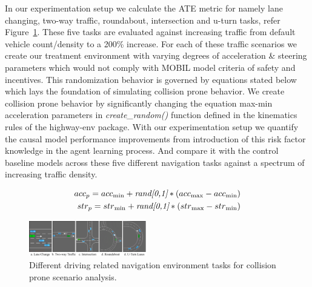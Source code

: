 \documentclass[a4, conference]{IEEEtran}
\begin{document}
    In our experimentation setup we calculate the ATE metric for namely lane changing, two-way traffic, roundabout, intersection and u-turn tasks, refer Figure~\ref{fig5}. These five tasks are evaluated against increasing traffic from default vehicle count/density to a 200\% increase. For each of these traffic scenarios we create our treatment environment with varying degrees of acceleration \& steering parameters which would not comply with MOBIL model criteria of safety and incentives. This randomization behavior is governed by equations stated below which lays the foundation of simulating collision prone behavior. We create collision prone behavior by significantly changing the equation max-min acceleration parameters in \textit{create\_random()} function defined in the kinematics rules of the highway-env package. With our experimentation setup we quantify the causal model performance improvements from introduction of this risk factor knowledge in the agent learning process. And compare it with the control baseline models across these five different navigation tasks against a spectrum of increasing traffic density.

    \begin{equation}
        \begin{alignedat}{2}\label{acc-eq}
            acc_p = acc\textsubscript{min} + \textit{rand[0,1]}*(acc\textsubscript{max} - acc\textsubscript{min}) \\
            str_p = str\textsubscript{min} + \textit{rand[0,1]}*(str\textsubscript{max} - str\textsubscript{min})
        \end{alignedat}
    \end{equation}

    \begin{figure}
        \centering
            \includegraphics[width=0.46\textwidth]{driving-task-environments.png}
            \caption{Different driving related navigation environment tasks for collision prone scenario analysis.}
        \label{fig5}
    \end{figure}
\end{document}
